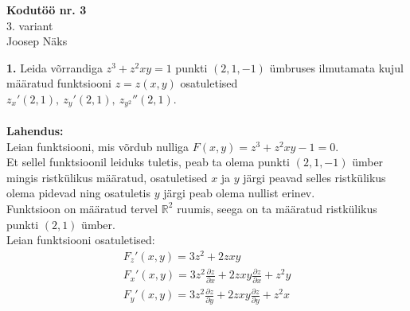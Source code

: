\documentclass{article}
\begin{document}
\begin{center}
\Large\textbf{Kodutöö nr. 3}\\
3. variant\\
\small{Joosep Näks}
\end{center}
\textbf{1. }Leida võrrandiga $z^3+z^2xy=1$ punkti $(2,1,-1)$ ümbruses ilmutamata kujul määratud funktsiooni $z=z(x,y)$ osatuletised $z_x'(2,1),\ z_y'(2,1),\ z_{y^2}''(2,1)$.\\\\
\textbf{Lahendus:}\\
Leian funktsiooni, mis võrdub nulliga $F(x,y)=z^3+z^2xy-1=0$.\\
Et sellel funktsioonil leiduks tuletis, peab ta olema punkti $(2,1,-1)$ ümber mingis ristkülikus määratud, osatuletised $x$ ja $y$ järgi peavad selles ristkülikus olema pidevad ning osatuletis $y$ järgi peab olema nullist erinev.\\
Funktsioon on määratud tervel $\mathbb{R}^2$ ruumis, seega on ta määratud ristkülikus punkti $(2,1)$ ümber.\\
Leian funktsiooni osatuletised:
\begin{gather*}
F_z'(x,y)=3z^2+2zxy\\
F_x'(x,y)=3z^2\frac{\partial z}{\partial x}+2zxy\frac{\partial z}{\partial x}+z^2y\\
F_y'(x,y)=3z^2\frac{\partial z}{\partial y}+2zxy\frac{\partial z}{\partial y}+z^2x\\
\end{gather*}
\end{document}
